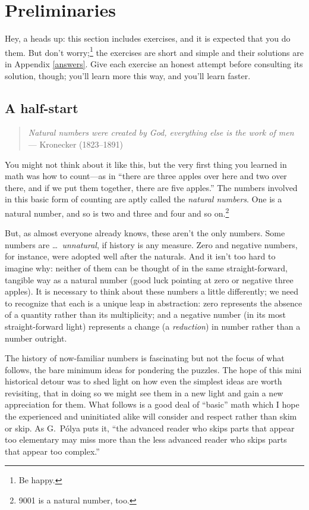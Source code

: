 \documentclass{book}
\begin{document}
\chapter{Preliminaries}\label{prelim}
Hey, a heads up: this section includes exercises, and it is expected that you do them. But don't worry;\footnote{Be happy.} the exercises are short and simple and their solutions are in Appendix \ref{answers}. Give each exercise an honest attempt before consulting its solution, though; you'll learn more this way, and you'll learn faster.

\section{A half-start}
\begin{quote}
\emph{Natural numbers were created by God, everything else is the work of men} — Kronecker (1823–1891)
\end{quote}
You might not think about it like this, but the very first thing you learned in math was how to count---as in ``there are three
apples over here and two over there, and if we put them together, there are five apples.'' The numbers involved in this basic form of counting are aptly called the \emph{natural numbers}. One is a natural number, and so is two and three and four and so on.\footnote{9001 is a natural number, too.}

But, as almost everyone already knows, these aren't the only numbers. Some numbers are \dots \emph{\ \!unnatural}, if history is any measure. Zero and negative numbers, for instance, were adopted well after the naturals. And it isn't too hard to imagine why: neither of them can be thought of in the same straight-forward, tangible way as a natural number (good luck pointing at zero or negative three apples). It is necessary to think about these numbers a little differently; we need to recognize that each is a unique leap in abstraction: zero represents the absence of a quantity rather than its multiplicity; and a negative number (in its most straight-forward light) represents a change (a \emph{reduction}) in number rather than a number outright.

The history of now-familiar numbers is fascinating but not the focus of what follows, the bare minimum ideas for pondering the puzzles. The hope of this mini historical detour was to shed light on how even the simplest ideas are worth revisiting, that in doing so we might see them in a new light and gain a new appreciation for them. What follows is a good deal of ``basic'' math which I hope the experienced and uninitiated alike will consider and respect rather than skim or skip. As G.\ P\'olya puts it, ``the advanced reader who skips parts that appear too elementary may miss more than the less advanced reader who skips parts that appear too complex.''
\end{document}
